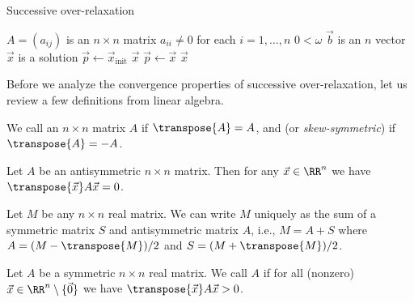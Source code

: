 \begin{algorithm}\label{alg:iterative-linear:sor:sor}
  \caption{Successive over-relaxation}
  \begin{algorithmic}[1]
    \Require $A=(a_{ij})$ is an $n\times n$ matrix
    \Require $a_{ii}\neq0$ for each $i=1,\dots,n$
    \Require $0<\omega$
    \Require $\vec{b}$ is an $n$ vector
    \Ensure $\vec{x}$ is a solution
    \State $\vec{p}\gets\vec{x}_{\text{init}}$ 
      \EndFor
        \State\Return $\vec{x}$
      \EndIf
      \State $\vec{p}\gets\vec{x}$
    \EndFor
    \State\Return $\vec{x}$
  \EndFunction
\end{algorithmic}
\end{algorithm}

Before we analyze the convergence properties of successive
over-relaxation, let us review a few definitions from linear algebra.

\begin{definition}
We call an $n\times n$ matrix $A$  if $\transpose{A}=A$,
and  (or \emph{skew-symmetric}) if $\transpose{A}=-A$.
\end{definition}

\begin{prop}
Let $A$ be an antisymmetric $n\times n$ matrix. Then for any
$\vec{x}\in\RR^{n}$ we have $\transpose{\vec{x}}A\vec{x}=0$.
\end{prop}

\begin{prop}
Let $M$ be any $n\times n$ real matrix. We can write $M$ uniquely as the
sum of a symmetric matrix $S$ and antisymmetric matrix $A$, i.e.,
$M=A+S$ where $A=(M-\transpose{M})/2$ and $S=(M+\transpose{M})/2$.
\end{prop}

\begin{definition}
Let $A$ be a symmetric $n\times n$ real matrix. We call $A$
 if for all (nonzero)
$\vec{x}\in\RR^{n}\setminus\{\vec{0}\}$ we have
$\transpose{\vec{x}}A\vec{x}>0$.
\end{definition}

